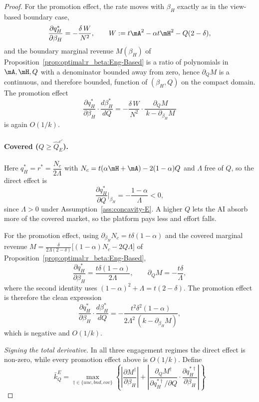 \begin{proof}
For the promotion effect, the rate moves with $\beta_H$ exactly as in the
view-based boundary case,
\[
    \frac{\partial q_H^*}{\partial\beta_H}
    =-\frac{\delta\,W}{N^{2}},
    \qquad W:=t\mA^{2}-\alpha t\mH^{2}-Q(2-\delta),
\]
and the boundary marginal revenue $M(\beta_H)$ of
Proposition~\ref{prop:optimal:r_beta:Eng-Based} is a ratio of polynomials in
$\mA,\mH,Q$ with a denominator bounded away from zero, hence $\partial_Q M$ is a
continuous, and therefore bounded, function of $(\beta_H,Q)$ on the compact domain.
The promotion effect
\[
    \frac{\partial q_H^*}{\partial\beta_H}\cdot\frac{d\beta_H^*}{dQ}
    =-\frac{\delta\,W}{N^{2}}\cdot\frac{\partial_Q M}{\,k-\partial_{\beta_H}M\,}
\]
is again $O(1/k)$.
 
\medskip
\paragraph{Covered ($Q\ge\hat Q^{c'}_E$).}
Here $q_H^*=r^*=\dfrac{N_c}{2\Lambda}$ with $N_c=t(\alpha\mH+\mA)-2(1-\alpha)Q$ and
$\Lambda$ free of $Q$, so the direct effect is
\[
    \frac{\partial q_H^*}{\partial Q}\bigg|_{\beta_H}=-\frac{1-\alpha}{\Lambda}<0,
\]
since $\Lambda>0$ under Assumption~\ref{ass:concavity-E}. A higher $Q$ lets the AI
absorb more of the covered market, so the platform pays less and effort falls.
 
For the promotion effect, using $\partial_{\beta_H}N_c=t\delta(1-\alpha)$ and the
covered marginal revenue
$M=\frac{\delta}{2\Lambda(2-\delta)}\bigl[(1-\alpha)N_c-2Q\Lambda\bigr]$ of
Proposition~\ref{prop:optimal:r_beta:Eng-Based},
\[
    \frac{\partial q_H^*}{\partial\beta_H}=\frac{t\delta(1-\alpha)}{2\Lambda},
    \qquad
    \partial_Q M=-\frac{t\delta}{\Lambda},
\]
where the second identity uses $(1-\alpha)^{2}+\Lambda=t(2-\delta)$. The promotion
effect is therefore the clean expression
\[
    \frac{\partial q_H^*}{\partial\beta_H}\cdot\frac{d\beta_H^*}{dQ}
    =-\frac{t^{2}\delta^{2}(1-\alpha)}{2\Lambda^{2}\,(k-\partial_{\beta_H}M)},
\]
which is negative and $O(1/k)$.
 
\medskip
\textit{Signing the total derivative.}
In all three engagement regimes the direct effect is non-zero, while every
promotion effect above is $O(1/k)$. Define 
\[
\bar{k}^E_Q = \max_{\dagger \in \{ unc,bnd,cov \}} \left\{ \left| \frac{\partial M^\dagger}{\partial \beta_H} \right| + \left| \frac{\partial_Q M^\dagger}{\partial q_H^{*\dagger}/\partial Q} \cdot \frac{\partial q_H^{*\dagger}}{\partial \beta_H} \right| \right\}
\]


\end{proof}
